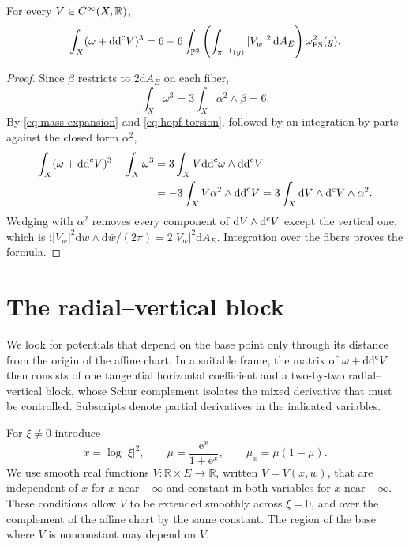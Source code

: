 \begin{proposition}\label{prop:hopf-mass}
For every $V\in C^\infty(X,\mathbb R)$,
\begin{equation}\label{eq:hopf-mass}
 \int_X(\omega+\mathrm{dd}^{\mathrm{c}} V)^3
 =6+6\int_{\mathbb P^2}
       \left(\int_{\pi^{-1}(y)}|V_w|^2\,\mathrm{d}A_E\right)
       \omega_{\mathrm{FS}}^2(y).
\end{equation}
\end{proposition}
\begin{proof}
Since $\beta$ restricts to $2\mathrm{d}A_E$ on each fiber,
\[
 \int_X\omega^3=3\int_X\alpha^2\wedge\beta=6.
\]
By \eqref{eq:mass-expansion} and \eqref{eq:hopf-torsion}, followed by an integration by parts against the closed form $\alpha^2$,
\[
 \begin{split}
 \int_X(\omega+\mathrm{dd}^{\mathrm{c}} V)^3-\int_X\omega^3
 &=3\int_X V\mathrm{dd}^{\mathrm{c}}\omega\wedge\mathrm{dd}^{\mathrm{c}} V\\
 &=-3\int_X V\alpha^2\wedge\mathrm{dd}^{\mathrm{c}} V
 =3\int_X\mathrm{d}V\wedge\mathrm d^{\mathrm c} V\wedge\alpha^2.
 \end{split}
\]
Wedging with $\alpha^2$ removes every component of $\mathrm{d}V\wedge\mathrm d^{\mathrm c} V$ except the vertical one, which is
$\mathrm i|V_w|^2\mathrm{d}w\wedge \mathrm{d}\bar w/(2\pi)=2|V_w|^2\mathrm{d}A_E$. Integration over the fibers proves the formula.
\end{proof}

\section{The radial--vertical block}

We look for potentials that depend on the base point only through its distance from the origin of the affine chart. In a suitable frame, the matrix of $\omega+\mathrm{dd}^{\mathrm{c}} V$ then consists of one tangential horizontal coefficient and a two-by-two radial--vertical block, whose Schur complement isolates the mixed derivative that must be controlled. Subscripts denote partial derivatives in the indicated variables.

For $\xi\ne0$ introduce
\[
 x=\log|\xi|^2,\qquad
 \mu=\frac{\mathrm{e}^x}{1+\mathrm{e}^x},\qquad \mu_x=\mu(1-\mu).
\]
We use smooth real functions $V\colon \mathbb R\times E\to\mathbb R$, written $V=V(x,w)$, that are independent of $x$ for $x$ near $-\infty$ and constant in both variables for $x$ near $+\infty$. These conditions allow $V$ to be extended smoothly across $\xi=0$, and over the complement of the affine chart by the same constant. The region of the base where $V$ is nonconstant may depend on $V$.

